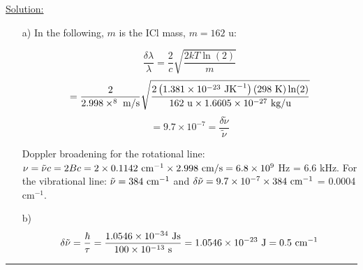 \noindent
\underline{Solution:}\\

\noindent

\begin{itemize}

\item[a)] In the following, $m$ is the ICl mass, $m = 162$ u:

$$\frac{\delta\lambda}{\lambda} = \frac{2}{c}\sqrt{\frac{2kT\ln(2)}{m}}$$
$$ = \frac{2}{2.998\times^8\textnormal{ m/s}}\sqrt{\frac{2\left(1.381\times 10^{-23}\textnormal{ JK}^{-1}\right)\left(298\textnormal{ K}\right)\ln(2)}{162\textnormal{ u}\times 1.6605\times 10^{-27}\textnormal{ kg/u}}}$$
$$ = 9.7\times 10^{-7} = \frac{\delta\tilde{\nu}}{\tilde{\nu}}$$

Doppler broadening for the rotational line: $\nu = \tilde{\nu}c = 2Bc = 2\times 0.1142\textnormal{ cm}^{-1} \times 2.998\textnormal{ cm/s} = 6.8\times 10^9$ Hz = 6.6 kHz. For the vibrational line: $\tilde{\nu} = 384\textnormal{ cm}^{-1}$ and $\delta\tilde{\nu} = 9.7\times 10^{-7}\times 384\textnormal{ cm}^{-1}$ = 0.0004 cm$^{-1}$.

\item[b)] $$\delta\tilde{\nu} = \frac{\hbar}{\tau} = \frac{1.0546\times 10^{-34}\textnormal{ Js}}{100\times 10^{-13}\textnormal{ s}} = 1.0546\times 10^{-23}\textnormal{ J} = 0.5\textnormal{ cm}^{-1}$$
\end{itemize}

\hrule\vspace{0.5cm}



